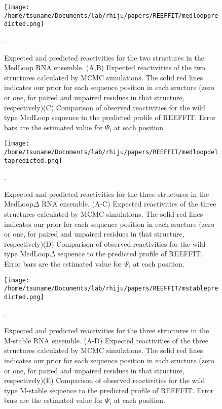 \documentclass[12pt]{article}
\begin{document}
\begin{figure}[here]
\texttt{[image: /home/tsuname/Documents/lab/rhiju/papers/REEFFIT/medlooppredicted.png]}
\caption{Expected and predicted reactivities for the two structures in the MedLoop RNA ensemble. (A,B) Expected reactivities of the two structures calculated by MCMC simulations. The solid red lines indicates our prior for each sequence position in each sructure (zero or one, for paired and unpaired residues in that structure, respectively)(C)  Comparison of observed reactivities for the wild type MedLoop sequence to the predicted profile of REEFFIT. Error bars are the estimated value for $\Psi_i$ at each position.}.
\label{fig:medlooppredictedfig}
\end{figure}


\begin{figure}[here]
\texttt{[image: /home/tsuname/Documents/lab/rhiju/papers/REEFFIT/medloopdeltapredicted.png]}
\caption{Expected and predicted reactivities for the three structures in the MedLoop$\Delta$ RNA ensemble. (A-C) Expected reactivities of the three structures calculated by MCMC simulations. The solid red lines indicates our prior for each sequence position in each sructure (zero or one, for paired and unpaired residues in that structure, respectively)(D)  Comparison of observed reactivities for the wild type MedLoop$\Delta$ sequence to the predicted profile of REEFFIT. Error bars are the estimated value for $\Psi_i$ at each position.}.
\label{fig:medloopdeltapredictedfig}
\end{figure}

\begin{figure}[here]
\texttt{[image: /home/tsuname/Documents/lab/rhiju/papers/REEFFIT/mstablepredicted.png]}
\caption{Expected and predicted reactivities for the three structures in the M-stable RNA ensemble. (A-D) Expected reactivities of the three structures calculated by MCMC simulations. The solid red lines indicates our prior for each sequence position in each sructure (zero or one, for paired and unpaired residues in that structure, respectively)(E)  Comparison of observed reactivities for the wild type M-stable sequence to the predicted profile of REEFFIT. Error bars are the estimated value for $\Psi_i$ at each position.}.
\label{fig:mstableredictedfig}
\end{figure}
\end{document}
